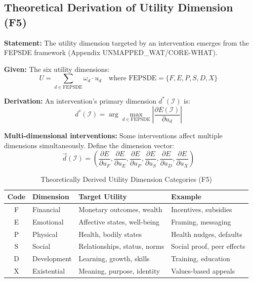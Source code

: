 \subsection{Theoretical Derivation of Utility Dimension (F5)}
\label{sec:hhh-dimension}

\begin{tcolorbox}[colback=blue!5!white, colframe=blue!75!black,
    title=\textbf{Theorem HHH-T4: Utility Dimension Emergence from WHAT}]

\textbf{Statement:} The utility dimension targeted by an intervention emerges from the FEPSDE framework (Appendix UNMAPPED_WAT/CORE-WHAT).

\textbf{Given:} The six utility dimensions:
\begin{equation}
U = \sum_{d \in \text{FEPSDE}} \omega_d \cdot u_d \quad \text{where FEPSDE} = \{F, E, P, S, D, X\}
\end{equation}

\textbf{Derivation:} An intervention's primary dimension $d^*(\mathcal{I})$ is:
\begin{equation}
d^*(\mathcal{I}) = \arg\max_{d \in \text{FEPSDE}} \left| \frac{\partial E(\mathcal{I})}{\partial u_d} \right|
\label{eq:hhh-dimension-mapping}
\end{equation}

\textbf{Multi-dimensional interventions:} Some interventions affect multiple dimensions simultaneously. Define the dimension vector:
\begin{equation}
\vec{d}(\mathcal{I}) = \left( \frac{\partial E}{\partial u_F}, \frac{\partial E}{\partial u_E}, \frac{\partial E}{\partial u_P}, \frac{\partial E}{\partial u_S}, \frac{\partial E}{\partial u_D}, \frac{\partial E}{\partial u_X} \right)
\end{equation}

\end{tcolorbox}

\begin{table}[htbp]
\centering
\caption{Theoretically Derived Utility Dimension Categories (F5)}
\label{tab:hhh-dimension-derived}
\renewcommand{\arraystretch}{1.3}
\begin{tabular}{@{}clp{5cm}p{3.5cm}@{}}
\toprule
\textbf{Code} & \textbf{Dimension} & \textbf{Target Utility} & \textbf{Example} \\
\midrule
F & Financial & Monetary outcomes, wealth & Incentives, subsidies \\
E & Emotional & Affective states, well-being & Framing, messaging \\
P & Physical & Health, bodily states & Health nudges, defaults \\
S & Social & Relationships, status, norms & Social proof, peer effects \\
D & Development & Learning, growth, skills & Training, education \\
X & Existential & Meaning, purpose, identity & Values-based appeals \\
\bottomrule
\end{tabular}
\end{table}


